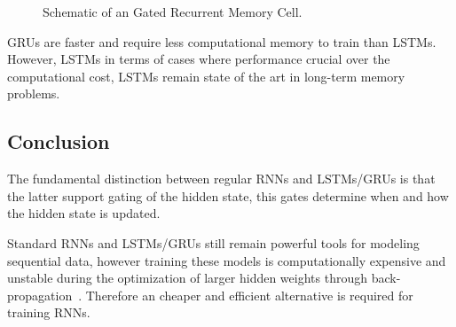 \documentclass{WitsPhysicsReport}
\begin{document}
\begin{figure}[H]
\caption{Schematic of an Gated Recurrent Memory Cell. }
\label{fig:gru}
\end{figure}


GRUs are faster and require less computational memory to train than LSTMs. However, LSTMs in terms of cases where performance crucial over the computational cost, LSTMs remain state  of the art in long-term memory problems. 

\subsection{Conclusion}
\label{sec:RNNs_conclusion}

The fundamental distinction between regular RNNs and LSTMs/GRUs is that the latter support gating of the hidden state, this gates determine when and how the hidden state is updated. 

Standard RNNs and LSTMs/GRUs still remain powerful tools for modeling sequential data, however training these models is computationally expensive and unstable during the optimization of  larger hidden weights through back-propagation~\cite{jaeger2003adaptive}. Therefore an cheaper and efficient alternative is required for training RNNs. 
\end{document}
